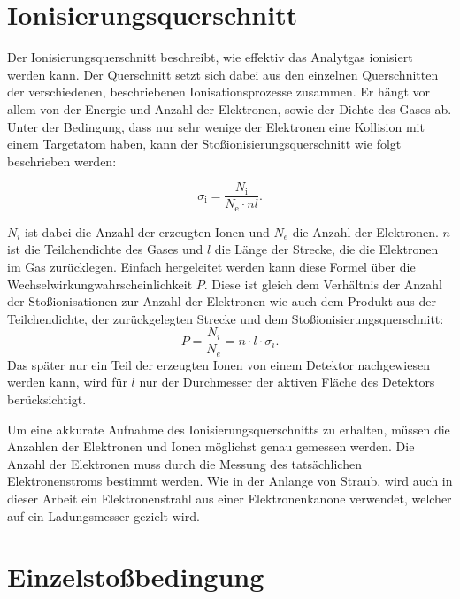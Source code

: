\section{Ionisierungsquerschnitt}
Der Ionisierungsquerschnitt beschreibt, wie effektiv das Analytgas ionisiert werden kann. Der Querschnitt setzt sich dabei aus den einzelnen Querschnitten der verschiedenen, beschriebenen Ionisationsprozesse zusammen. Er hängt vor allem von der Energie und Anzahl der Elektronen, sowie der Dichte des Gases ab. Unter der Bedingung, dass nur sehr wenige der Elektronen eine Kollision mit einem Targetatom haben, kann der Stoßionisierungsquerschnitt wie folgt beschrieben werden:

\begin{equation}
    \sigma_{\text{i}} = \frac{N_{\text{i}}}{N_{\text{e}} \cdot n l}.
\end{equation}

$N_i$ ist dabei die Anzahl der erzeugten Ionen und $N_e$ die Anzahl der Elektronen. $n$ ist die Teilchendichte des Gases und $l$ die Länge der Strecke, die die Elektronen im Gas zurücklegen. Einfach hergeleitet werden kann diese Formel über die Wechselwirkungwahrscheinlichkeit $P$. Diese ist gleich dem Verhältnis der Anzahl der Stoßionisationen zur Anzahl der Elektronen wie auch dem Produkt aus der Teilchendichte, der zurückgelegten Strecke und dem Stoßionisierungsquerschnitt: 
\begin{equation}
    P = \frac{N_i}{N_e} = n \cdot l \cdot \sigma_i.
\end{equation}
Das später nur ein Teil der erzeugten Ionen von einem Detektor nachgewiesen werden kann, wird für $l$ nur der Durchmesser der aktiven Fläche des Detektors berücksichtigt. 

Um eine akkurate Aufnahme des Ionisierungsquerschnitts zu erhalten, müssen die Anzahlen der Elektronen und Ionen möglichst genau gemessen werden. Die Anzahl der Elektronen muss durch die Messung des tatsächlichen Elektronenstroms bestimmt werden. Wie in der Anlange von Straub, wird auch in dieser Arbeit ein Elektronenstrahl aus einer Elektronenkanone verwendet, welcher auf ein Ladungsmesser gezielt wird.

\section{Einzelstoßbedingung}